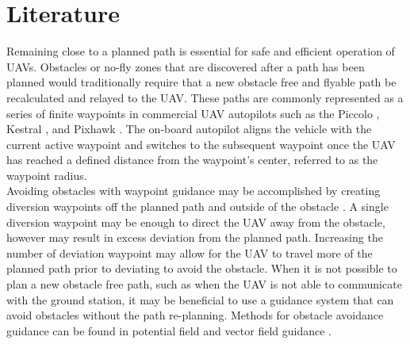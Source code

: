 \documentclass[conf]{new-aiaa}
\begin{document}
%

\section{Literature}
Remaining close to a planned path is essential for safe and efficient operation of UAVs. Obstacles or no-fly zones that are discovered after a path has been planned would traditionally require that a new obstacle free and flyable path be recalculated and relayed to the UAV. These paths are commonly represented as a series of finite waypoints in commercial UAV autopilots such as the Piccolo \cite{piccolo}, Kestral \cite{kestrel}, and Pixhawk \cite{pix}. The on-board autopilot aligns the vehicle with the current active waypoint and switches to the subsequent waypoint once the UAV has reached a defined distance from the waypoint’s center, referred to as the waypoint radius. \\

Avoiding obstacles with waypoint guidance may be accomplished by creating diversion waypoints off the planned path and outside of the obstacle \cite{goerzen_survey_2010}. A single diversion waypoint may be enough to direct the UAV away from the obstacle, however may result in excess deviation from the planned path. Increasing the number of deviation waypoint may allow for the UAV to travel more of the planned path prior to deviating to avoid the obstacle. When it is not possible to plan a new obstacle free path, such as when the UAV is not able to communicate with the ground station, it may be beneficial to use a guidance system that can avoid obstacles without the path re-planning. Methods for obstacle avoidance guidance can be found in potential field \cite{borenstein_real-time_1990,borenstein_vector_1991} and vector field guidance \cite{frew_cooperative_2007,nelson_cooperative_2005,nelson_vector_2006,nelson_vector_2007,griffiths_vector_2006,goncalves_artificial_2009,goncalves_circulation_2010,goncalves_vector_2010}. \\ 
\end{document}

